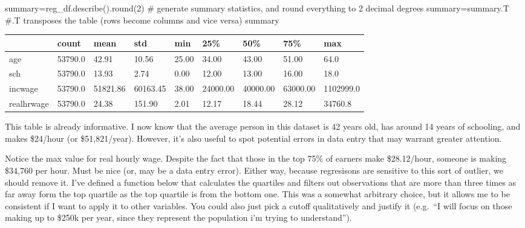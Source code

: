 \documentclass[
  letterpaper,
  DIV=11,
  numbers=noendperiod]{scrreprt}
\newenvironment{Shaded}{\begin{snugshade}}{\end{snugshade}}
\newcommand{\BuiltInTok}[1]{\textcolor[rgb]{0.00,0.23,0.31}{#1}}
\newcommand{\CommentTok}[1]{\textcolor[rgb]{0.37,0.37,0.37}{#1}}
\newcommand{\DecValTok}[1]{\textcolor[rgb]{0.68,0.00,0.00}{#1}}
\newcommand{\NormalTok}[1]{\textcolor[rgb]{0.00,0.23,0.31}{#1}}
\newcommand{\OperatorTok}[1]{\textcolor[rgb]{0.37,0.37,0.37}{#1}}
\begin{document}
\begin{Shaded}
\begin{Highlighting}[]
\NormalTok{summary}\OperatorTok{=}\NormalTok{reg\_df.describe().}\BuiltInTok{round}\NormalTok{(}\DecValTok{2}\NormalTok{)  }\CommentTok{\# generate summary statistics, and round everything to 2 decimal degrees}
\NormalTok{summary}\OperatorTok{=}\NormalTok{summary.T }\CommentTok{\#.T transposes the table (rows become columns and vice versa)}
\NormalTok{summary}
\end{Highlighting}
\end{Shaded}

\begin{longtable}[]{@{}lllllllll@{}}
\toprule\noalign{}
& count & mean & std & min & 25\% & 50\% & 75\% & max \\
\midrule\noalign{}
\endhead
\bottomrule\noalign{}
\endlastfoot
age & 53790.0 & 42.91 & 10.56 & 25.00 & 34.00 & 43.00 & 51.00 & 64.0 \\
sch & 53790.0 & 13.93 & 2.74 & 0.00 & 12.00 & 13.00 & 16.00 & 18.0 \\
incwage & 53790.0 & 51821.86 & 60163.45 & 38.00 & 24000.00 & 40000.00 &
63000.00 & 1102999.0 \\
realhrwage & 53790.0 & 24.38 & 151.90 & 2.01 & 12.17 & 18.44 & 28.12 &
34760.8 \\
\end{longtable}

This table is already informative. I now know that the average person in
this dataset is 42 years old, has around 14 years of schooling, and
makes \$24/hour (or \$51,821/year). However, it's also useful to spot
potential errors in data entry that may warrant greater attention.

Notice the max value for real hourly wage. Despite the fact that those
in the top 75\% of earners make \$28.12/hour, someone is making \$34,760
per hour. Must be nice (or, may be a data entry error). Either way,
because regresisons are sensitive to this sort of outlier, we should
remove it. I've defined a function below that calculates the quartiles
and filters out observations that are more than three times as far away
form the top quartile as the top quartile is from the bottom one. This
was a somewhat arbitrary choice, but it allows me to be consistent if I
want to apply it to other variables. You could also just pick a cutoff
qualitatively and justify it (e.g.~``I will focus on those making up to
\$250k per year, since they represent the population i'm trying to
understand'').
\end{document}
